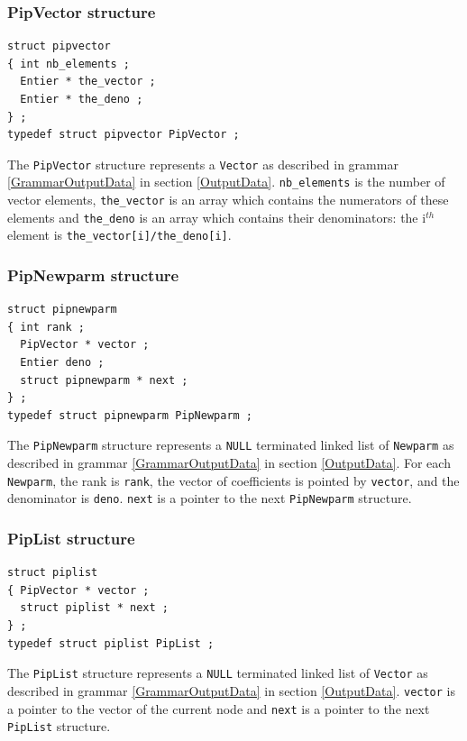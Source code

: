 \documentclass[12pt,a4paper]{article}
\begin{document}
\subsubsection{PipVector structure}
\begin{verbatim}
struct pipvector
{ int nb_elements ;
  Entier * the_vector ;
  Entier * the_deno ;
} ;
typedef struct pipvector PipVector ;
\end{verbatim}
The {\tt PipVector} structure represents a {\tt Vector}
as described in grammar \ref{GrammarOutputData} in section \ref{OutputData}.
{\tt nb\_elements} is the number of vector elements, {\tt the\_vector} is
an array which contains the numerators of these elements and {\tt the\_deno}
is an array which contains their denominators: the i$^{th}$ element is
{\tt the\_vector[i]/the\_deno[i]}.

\subsubsection{PipNewparm structure}
\begin{verbatim}
struct pipnewparm
{ int rank ;
  PipVector * vector ;
  Entier deno ;
  struct pipnewparm * next ;
} ;
typedef struct pipnewparm PipNewparm ;
\end{verbatim}
The {\tt PipNewparm} structure represents a {\tt NULL} terminated linked list of
{\tt Newparm} as described in grammar \ref{GrammarOutputData}
in section \ref{OutputData}. For each {\tt Newparm}, the rank is {\tt rank},
the vector of coefficients is pointed by {\tt vector}, and the denominator
is {\tt deno}. {\tt next} is a pointer to the next {\tt PipNewparm} structure.

\subsubsection{PipList structure}
\begin{verbatim}
struct piplist
{ PipVector * vector ;
  struct piplist * next ;
} ;
typedef struct piplist PipList ;
\end{verbatim}
The {\tt PipList} structure represents a {\tt NULL} terminated linked list of
{\tt Vector} as described in grammar \ref{GrammarOutputData} in section
\ref{OutputData}. {\tt vector} is a pointer to the vector of the current node and
{\tt next} is a pointer to the next {\tt PipList} structure.
\end{document}

